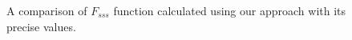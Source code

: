 \documentclass[1p]{elsarticle}
\begin{document}
\begin{figure}[tp]
{    \label{fig:sss-dumbbell-precise}}
  \hfill
  \caption[]{A comparison of $F_{sss}$ function calculated using our approach
    with its precise values.}
  \label{fig:sss-verification}
\end{figure}
\end{document}
